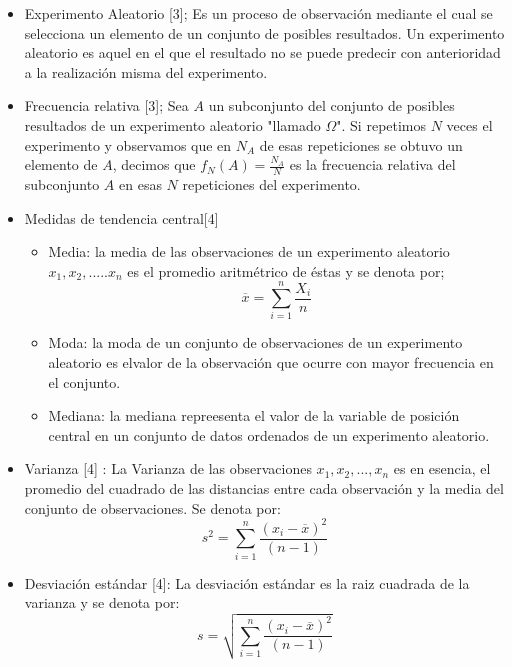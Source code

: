   \begin{itemize}
  	\item Experimento Aleatorio [3]; Es un proceso de observación mediante el cual se selecciona un elemento de un conjunto de posibles resultados. Un experimento aleatorio es aquel en el que el resultado no se puede predecir con anterioridad a la realización misma del experimento. 
  	
   \item Frecuencia relativa [3]; Sea $A$ un subconjunto del conjunto de posibles resultados de un experimento aleatorio "llamado $\Omega$". Si repetimos $N$ veces el experimento y observamos que en $N_{A}$ de esas repeticiones se obtuvo un elemento de $A$, decimos que $f_{N}(A)=\frac{N_{A}}{N}$ es la frecuencia relativa del subconjunto $A$ en esas $N$  repeticiones del experimento.
   
   \item Medidas de tendencia central[4] 
	   \begin{itemize}
		 	\item Media: la media de las observaciones de un experimento aleatorio $x_{1},x_{2},.....x_{n}$ es el promedio aritm\'etrico de \'estas y se denota por;
		 	$$\overline{x}=\sum_{i=1}^{n} \frac{X_{i}}{n}$$ 
		 	\item Moda: la moda de un conjunto de observaciones de un experimento aleatorio es elvalor de la observaci\'on que ocurre con mayor frecuencia en el conjunto.
		 	\item Mediana: la mediana repreesenta el valor de la variable de posición central en un conjunto de datos ordenados de un experimento aleatorio.
		 \end{itemize}
 \item Varianza [4] : La Varianza de las observaciones $x_{1},x_{2},...,x_{n}$ es en esencia, el promedio del cuadrado de las distancias entre cada observaci\'on y la media del conjunto de observaciones. Se denota por:
 $$s^{2}=\sum_{i=1}^{n} \frac{ \left( x_{i}-\overline{x}\right)^{2}}{\left(n-1 \right) } $$ 
 
 
 \item Desviaci\'on est\'andar [4]: La desviaci\'on est\'andar es la raiz cuadrada de la varianza y se denota por:
 $$s=\sqrt{\sum_{i=1}^{n} \frac{ \left( x_{i}-\overline{x}\right)^{2}}{\left(n-1 \right) } }$$ 
 
\end{itemize}  



